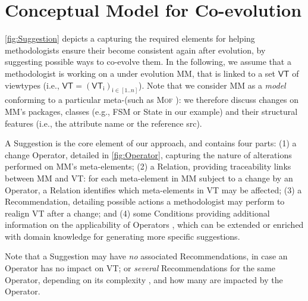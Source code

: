 \section{Conceptual Model for \Viewtype Co-evolution}
\label{sec:Suggestion}

\cref{fig:Suggestion} depicts a \metamodel capturing the
required elements for helping methodologists ensure their \viewtypes become consistent again after \metamodel evolution,
by suggesting possible ways to co-evolve them.
In the following, we assume that a methodologist is working on a \metamodel
under evolution \textsf{MM}, that is linked to a set $\mathsf{VT}$ of viewtypes
(i.e., $\mathsf{VT} = (\mathsf{VT}_\mathsf{i})_{\mathsf{i}\in [1..n]}$). Note that
we consider \textsf{MM} as a \emph{model}
conforming to a particular meta-\metamodel (such as \textsc{Mof} \cite{TR:OMG-MOF:2016}):
we therefore discuss changes on \textsf{MM}'s packages, classes (e.g., 
\textsf{FSM} or \textsf{State} in our example) and their structural features
(i.e., the attribute \textsf{name} or the reference \textsf{src}).

A \textsf{Suggestion} is the core element of our approach, and contains four 
parts: (1) a change \textsf{Operator}, detailed in \cref{fig:Operator}, 
capturing the nature of alterations performed on \textsf{MM}'s meta-elements; 
(2) a \textsf{Relation}, providing traceability links between \textsf{MM} 
and \textsf{VT}: for each meta-element in \textsf{MM} subject to a 
change by an \textsf{Operator}, a \textsf{Relation} identifies which 
meta-elements in \textsf{VT} may be affected;
(3) a \textsf{Recommendation}, detailing possible actions a methodologist 
may perform to realign \textsf{VT} after a change; and 
(4) some \textsf{Condition}s providing additional information on the applicability
of \textsf{Operator}s , which can be extended or enriched with domain knowledge 
for generating more specific suggestions.


Note that a \textsf{Suggestion} may 
have \emph{no} associated \textsf{Recommendation}s, in case an \textsf{Operator} has no
impact on \textsf{VT}; or \emph{several} \textsf{Recommendation}s for the same 
\textsf{Operator}, depending on its complexity , and how many \viewtypes are 
impacted by the \textsf{Operator}. 

